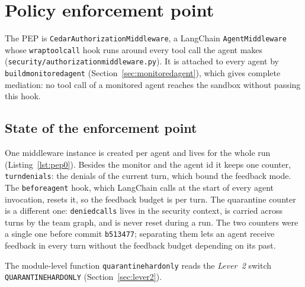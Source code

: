 \documentclass[11pt,a4paper]{article}
\DeclareRobustCommand{\code}[1]{{\renewcommand{\_}{\textunderscore\allowbreak}\texttt{#1}}}
\begin{document}
\section{Policy enforcement point}
\label{sec:pep}

The PEP is \code{CedarAuthorizationMiddleware}, a LangChain \code{AgentMiddleware} whose
\code{wrap\_tool\_call} hook runs around every tool call the agent makes
(\code{security/authorization\_middleware.py}). It is attached to every agent by
\code{build\_monitored\_agent} (Section~\ref{sec:monitoredagent}), which gives complete
mediation: no tool call of a monitored agent reaches the sandbox without passing this hook.

\subsection{State of the enforcement point}

One middleware instance is created per agent and lives for the whole run
(Listing~\ref{lst:pep0}). Besides the monitor and the agent id it keeps one counter,
\code{\_turn\_denials}: the denials of the current turn, which bound the feedback mode. The
\code{before\_agent} hook, which LangChain calls at the start of every agent invocation,
resets it, so the feedback budget is per turn. The quarantine counter is a different
one: \code{denied\_calls} lives in the security context, is carried across turns by the
team graph, and is never reset during a run. The two counters were a single one before
commit \code{b513477}; separating them lets an agent receive feedback in every turn
without the feedback budget depending on its past.

The module-level function \code{\_quarantine\_hard\_only} reads the \emph{Lever~2}
switch \code{QUARANTINE\_HARD\_ONLY} (Section~\ref{sec:lever2}).
\end{document}
